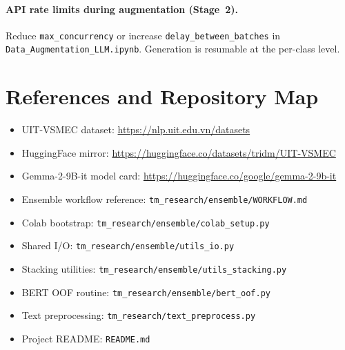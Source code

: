 \documentclass[11pt,a4paper]{article}
\newcommand{\repo}[1]{\texttt{#1}}
\begin{document}
\paragraph{API rate limits during augmentation (Stage~2).}
Reduce \texttt{max\_concurrency} or increase \texttt{delay\_between\_batches} in \repo{Data\_Augmentation\_LLM.ipynb}. Generation is resumable at the per-class level.

\section{References and Repository Map}
\label{sec:references}

\begin{itemize}[nosep]
  \item UIT-VSMEC dataset: \url{https://nlp.uit.edu.vn/datasets}
  \item HuggingFace mirror: \url{https://huggingface.co/datasets/tridm/UIT-VSMEC}
  \item Gemma-2-9B-it model card: \url{https://huggingface.co/google/gemma-2-9b-it}
  \item Ensemble workflow reference: \repo{tm\_research/ensemble/WORKFLOW.md}
  \item Colab bootstrap: \repo{tm\_research/ensemble/colab\_setup.py}
  \item Shared I/O: \repo{tm\_research/ensemble/utils\_io.py}
  \item Stacking utilities: \repo{tm\_research/ensemble/utils\_stacking.py}
  \item BERT OOF routine: \repo{tm\_research/ensemble/bert\_oof.py}
  \item Text preprocessing: \repo{tm\_research/text\_preprocess.py}
  \item Project README: \repo{README.md}
\end{itemize}
\end{document}
